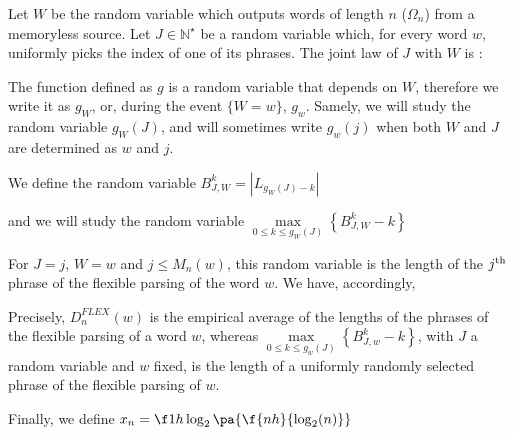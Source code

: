 

\separation
\bk


Let $W$ be the random variable which outputs words of length $n$ ($\Omega_n$)
from a memoryless source. Let $J \in \mathbb{N}^{\star}$ be a random
variable which, for every word $w$, uniformly picks the index of
one of its phrases. The joint law of $J$ with $W$ is :



\noindent
The function defined as $g$ is a random variable that depends on $W$, therefore
we write it as $g_W$, or, during the event $\{ W=w \}$, $g_w$. Samely, we will
study the random variable $g_W(J)$, and will
sometimes write $g_w(j)$ when both $W$ and $J$ are determined as $w$ and $j$.


\leftcenters
    {We define the random variable}
    {$B_{J, W}^k = | L_{g_W(J) - k} |$}

\noindent
and we will study the random variable
    {$ \underset{ 0 \leq k \leq g_W(J) }{ \max } 
                    \left\{ { B_{J, W}^k - k } \right\} $}

\noindent
For $J = j$, $W = w$ and $j \leq M_n(w)$, this random variable is the length of 
the $j^{\textmd{th}}$ phrase of the flexible parsing of the word $w$. We have,
accordingly,

\noindent
Precisely, $D_n^{FLEX}(w)$ is the empirical average of the lengths of the phrases
of the flexible parsing of a word $w$, whereas 
        $\underset{ 0 \leq k \leq g_w(J) }{ \max } 
        \left\{ { B_{J, w}^k - k } \right\} $,
with $J$ a random variable and $w$ fixed,
is the length of a uniformly randomly selected phrase of the flexible parsing
of $w$. 

\leftcenters   
    {Finally, we define}
    {$x_n = \f1{h} \log_2 \pa{ \f{nh}{\log_2(n)} }$}

